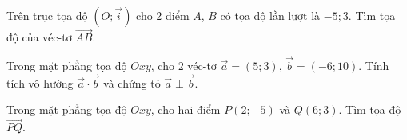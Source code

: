\begin{bt}%
Trên trục tọa độ $\left(O;\overrightarrow{i}\right)$ cho 2 điểm $A$, $B$ có tọa độ lần lượt là $-5; 3$. Tìm tọa độ của véc-tơ $\overrightarrow{AB}$.
\end{bt}

\begin{bt}%
	Trong mặt phẳng tọa độ $Oxy$, cho $2$ véc-tơ $\overrightarrow{a}=(5;3)$, $\overrightarrow{b}=(-6;10)$. Tính tích vô hướng $\overrightarrow{a}\cdot \overrightarrow{b}$ và chứng tỏ $\overrightarrow{a}\perp\overrightarrow{b}$.
\end{bt}

\begin{bt}%
	Trong mặt phẳng tọa độ $Oxy$, cho hai điểm $P(2; -5)$ và $Q(6; 3)$. Tìm tọa độ $\overrightarrow{PQ}$.
\end{bt}

